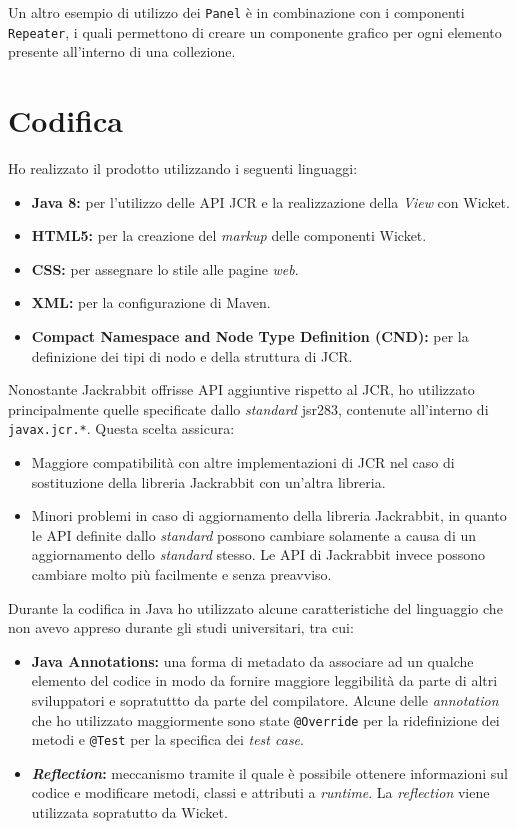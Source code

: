 		Un altro esempio di utilizzo dei \texttt{Panel} è in combinazione con i componenti \texttt{Repeater}, i quali permettono di creare un componente grafico per ogni elemento presente all'interno di una collezione.
			
\section{Codifica}
	Ho realizzato il prodotto utilizzando i seguenti linguaggi:
	\begin{itemize}
		\item \textbf{Java 8:} per l'utilizzo delle API JCR e la realizzazione della \textit{View} con Wicket.
		\item \textbf{HTML5:} per la creazione del \textit{markup} delle componenti Wicket.
		\item \textbf{CSS:} per assegnare lo stile alle pagine \textit{web}.
		\item \textbf{XML:} per la configurazione di Maven.
		\item \textbf{Compact Namespace and Node Type Definition (CND):} per la definizione dei tipi di nodo e della struttura di JCR. 
	\end{itemize}	
	Nonostante Jackrabbit offrisse API aggiuntive rispetto al JCR, ho utilizzato principalmente quelle specificate dallo \textit{standard} \gls{jsr283}, contenute all'interno di \texttt{javax.jcr.*}. Questa scelta assicura:
	\begin{itemize}
		\item Maggiore compatibilità con altre implementazioni di JCR nel caso di sostituzione della libreria Jackrabbit con un'altra libreria.
		\item Minori problemi in caso di aggiornamento della libreria Jackrabbit, in quanto le API definite dallo \textit{standard} possono cambiare solamente a causa di un aggiornamento dello \textit{standard} stesso. Le API di Jackrabbit invece possono cambiare molto più facilmente e senza preavviso.
	\end{itemize}
	Durante la codifica in Java ho utilizzato alcune caratteristiche del linguaggio che non avevo appreso durante gli studi universitari, tra cui:
	\begin{itemize}
		\item \textbf{Java Annotations:} una forma di metadato da associare ad un qualche elemento del codice in modo da fornire maggiore leggibilità da parte di altri sviluppatori e sopratuttto da parte del compilatore. Alcune delle \textit{annotation} che ho utilizzato maggiormente sono state \texttt{@Override} per la ridefinizione dei metodi e \texttt{@Test} per la specifica dei \textit{test case}.
		\item \textbf{\textit{Reflection}:} meccanismo tramite il quale è possibile ottenere informazioni sul codice e modificare metodi, classi e attributi a \textit{runtime}. La \textit{reflection} viene utilizzata sopratutto da Wicket.
	\end{itemize}
